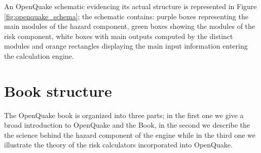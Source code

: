 An OpenQuake schematic evidencing its actual structure is 
represented in Figure \ref{fig:openquake_schema}; the schematic contains:
purple boxes representing the main modules of the hazard component, 
green boxes showing the modules of the risk component, white boxes
with main outputs computed by the distinct modules and orange rectangles
displaying the main input information entering the calculation engine. 
%
%

%
\section{Book structure}
The OpenQuake book is organized into three parts; in the first one we give
a broad introduction to OpenQuake and the Book, in the second we 
describe the the science behind the hazard component of the engine
while in the third one we illustrate the theory of the risk calculators
incorporated into OpenQuake.

